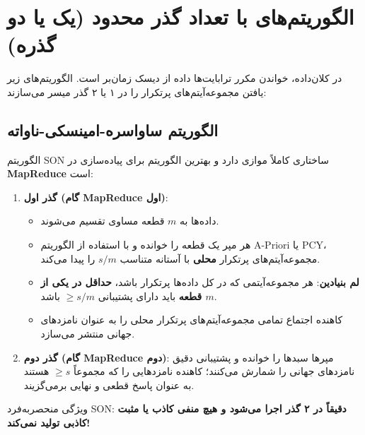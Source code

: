 \section{الگوریتم‌های با تعداد گذر محدود (یک یا دو گذره)}
در کلان‌داده، خواندن مکرر ترابایت‌ها داده از دیسک زمان‌بر است. الگوریتم‌های زیر یافتن مجموعه‌آیتم‌های پرتکرار را در ۱ یا ۲ گذر میسر می‌سازند:

\subsection{الگوریتم ساواسره-امینسکی-ناواته \texorpdfstring{}{(SON)}}
الگوریتم SON ساختاری کاملاً موازی دارد و بهترین الگوریتم برای پیاده‌سازی در \textbf{MapReduce} است:

\begin{algorithmbox}
\begin{enumerate}
    \item \textbf{گذر اول (گام MapReduce اول)}:
    \begin{itemize}
        \item داده‌ها به $m$ قطعه مساوی  تقسیم می‌شوند.
        \item هر مپر یک قطعه را خوانده و با استفاده از الگوریتم A-Priori یا PCY، مجموعه‌آیتم‌های پرتکرار \textbf{محلی} با آستانه متناسب $s/m$ را پیدا می‌کند.
        \item \textbf{لم بنیادین}: هر مجموعه‌آیتمی که در کل داده‌ها پرتکرار باشد، \textbf{حداقل در یکی از $m$ قطعه} باید دارای پشتیبانی $\ge s/m$ باشد.
        \item کاهنده اجتماع تمامی مجموعه‌آیتم‌های پرتکرار محلی را به عنوان نامزدهای جهانی منتشر می‌سازد.
    \end{itemize}
    
    \item \textbf{گذر دوم (گام MapReduce دوم)}:
    مپرها سبدها را خوانده و پشتیبانی دقیق نامزدهای جهانی را شمارش می‌کنند؛ کاهنده نامزدهایی را که مجموعاً $\ge s$ هستند به عنوان پاسخ قطعی و نهایی برمی‌گزیند.
\end{enumerate}
\end{algorithmbox}
ویژگی منحصربه‌فرد SON: \textbf{دقیقاً در ۲ گذر اجرا می‌شود و هیچ منفی کاذب یا مثبت کاذبی تولید نمی‌کند!}

